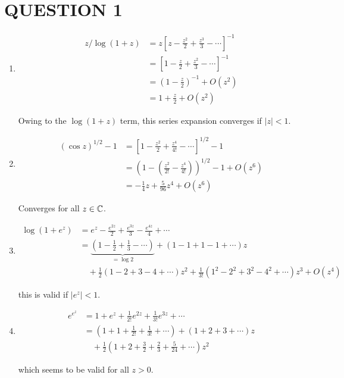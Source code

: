 \documentclass[a4paper]{article}
\begin{document}
	
\maketitle

\section{QUESTION 1}


\begin{enumerate}
	\item \begin{align*}
	z/\log(1+z)& = z \left[  z - \frac{z^{2}}{2} + \frac{z^{3}}{3} - \cdots     \right]^{-1}  \\
	& = \left[  1 - \frac{z}{2} + \frac{z^{2}}{3} - \cdots     \right]^{-1} \\
	& = \left(  1 - \frac{z}{2} \right)^{-1} + O(z^{2}) \\
	& = 1 + \frac{z}{2} + O(z^{2}) 
	\end{align*}
	
	
	Owing to the $ \log(1+z) $ term, this series expansion converges if $ | z | < 1 $. 
	
	
	\item \begin{align*}
	(\cos z)^{1/2} -1 & = \left[   1 - \frac{z^{2}}{2} +  \frac{z^{4}}{4!} - \cdots  \right]^{1/2} - 1  \\
	& = \left(  1 - \left(  \frac{z^{2}}{2!} - \frac{z^{4}}{4!}  \right)  \right)^{1/2} - 1 + O(z^{6}) \\
	& = - \frac{1}{4} z + \frac{5}{96} z^{4} + O(z^{6}) 
	\end{align*}
	
	Converges for all $ z \in \mathbb{C} $.
	
	\item \begin{align*}
	\log(1+e^{z})  & = e^{z} - \frac{e^{2z}}{2} + \frac{e^{3z}}{3} - \frac{e^{4z}}{4} + \cdots   \\
	& = \underbrace{\left(  1 - \frac{1}{2} + \frac{1}{3} - \cdots \right)}_{= \log 2} + \left( 1 - 1 + 1 - 1 + \cdots \right) z  \\
	& \quad + \frac{1}{2}\left( 1 - 2 + 3 - 4 + \cdots   \right) z^{2} + \frac{1}{3!} \left( 1^{2} - 2^{2} + 3^{2} - 4^{2} +  \cdots   \right) z^{3} +  O(z^{4}) 
	\end{align*}
	
	this is valid if $ | e^{z} | < 1 $.
	
	
	\item \begin{align*}
	e^{e^{z}} & = 1 + e^{z} +  \frac{1}{2!}e^{2z}+ \frac{1}{3!}  e^{3z} + \cdots \\
	& = \left(  1 + 1 + \frac{1}{2!} + \frac{1}{3!} + \cdots \right)  + \left(  1 + 2 + 3 + \cdots \right) z \\
	& \quad + \frac{1}{2} \left( 1 + 2 + \frac{3}{2} + \frac{2}{3} + \frac{5}{24} + \cdots   \right)z^{2}
	\end{align*}
	
	which seems to be valid for all $ z > 0 $. 
	
\end{enumerate}
\end{document}
